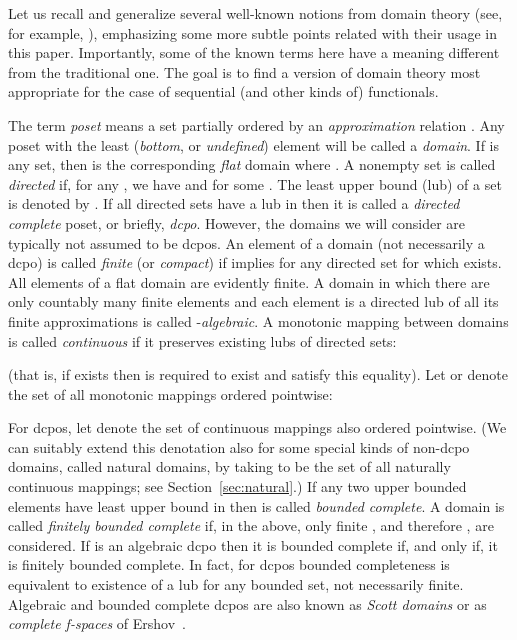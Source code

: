 \documentclass[fleqn]{LMCS}
\theoremstyle{plain}\newtheorem{satz}[thm]{Satz}
\theoremstyle{plain}\newtheorem{hyp}[thm]{Hypothesis}
\theoremstyle{plain}\newtheorem{hyps}[thm]{Hypotheses}
\theoremstyle{definition}\newtheorem{note}[thm]{Note}
\newcommand{\?}{\mbox{?}}
\begin{document}
\noindent
Let us recall and generalize several well-known notions from domain theory 
(see, for example, \cite{Abramsky-Jung1994,Plo81}), 
emphasizing some more subtle points related with 
their usage in this paper.  
Importantly,  
some of the known terms here have a meaning different from the traditional one. 
The goal is to find a version of domain theory most appropriate for the case 
of sequential (and other kinds of) functionals. 



The term {\em poset} means a set  partially ordered 
by an {\em approximation} relation . 
Any poset  with the least ({\em bottom}, or {\em undefined}) 
element  will be called a \emph{domain}. 
If  is any set, then  is the
corresponding {\em flat} domain where . 
A nonempty set  is called \emph{directed} 
if, for any , we have  and  
for some . 
The least upper bound (lub) of a set  is denoted by . 
If all directed sets have a lub in  
then it is called a {\em directed complete} 
poset, or briefly, \emph{dcpo}. 
However, the domains we will consider are typically not assumed to be dcpos. 
An element  of a domain (not necessarily a dcpo) is called 
\emph{finite} (or \emph{compact}) 
if  implies  for any
directed set  for which  exists. 
All elements of a flat domain are evidently finite. 
A 
domain  in which 
there are only countably many finite elements 
and each element  is a directed lub of all its finite approximations 
is called 
-\emph{algebraic}. 
A monotonic mapping  between domains is called 
\emph{continuous} 
if it preserves 
existing lubs  of directed sets: 
 
(that is, if  exists then  
is required to exist and satisfy this equality). 
Let  or  
denote the set of all monotonic mappings ordered pointwise: 

For dcpos, let  denote the set of continuous mappings also 
ordered pointwise. 
(We can suitably extend this denotation also for some special kinds 
of non-dcpo domains, called natural domains, by taking  to be 
the set of all naturally continuous mappings; see Section~\ref{sec:natural}.) 
If any two upper bounded elements  have least upper bound  
in  then  is called \emph{bounded complete}. 
A domain is called \emph{finitely bounded complete} if, in the above, 
only finite , and therefore , are considered. 
If  is an algebraic dcpo then 
it is bounded complete if, and only if, it is finitely bounded complete. 
In fact, for dcpos bounded completeness is equivalent to existence of a lub for 
any bounded set, not necessarily finite. 
Algebraic and bounded complete dcpos are also known as \emph{Scott domains} 
or as \emph{complete f-spaces} of Ershov~\cite{Ershov72}. 
\end{document}
